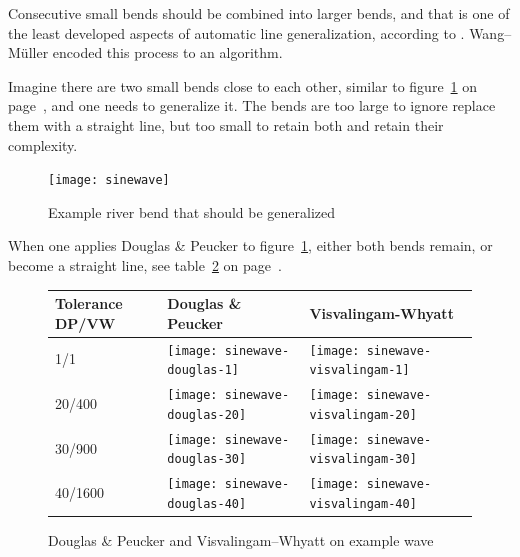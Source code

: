\documentclass[a4paper]{article}
\newcommand{\DP}{Douglas \& Peucker}
\newcommand{\VW}{Visvalingam--Whyatt}
\newcommand{\WM}{Wang--M{\"u}ller}
\begin{document}
Consecutive small bends should be combined into larger bends, and that is one
of the least developed aspects of automatic line generalization, according to
\cite{miuller1995generalization}. {\WM} encoded this process to an algorithm.

Imagine there are two small bends close to each other, similar to
figure~\ref{pic:sinewave} on page~\pageref{pic:sinewave}, and one needs
to generalize it. The bends are too large to ignore replace them with a
straight line, but too small to retain both and retain their complexity.

\begin{figure}[h]
    \centering
    \texttt{[image: sinewave]}
    \caption{Example river bend that should be generalized}
    \label{pic:sinewave}
\end{figure}

When one applies {\DP} to figure~\ref{pic:sinewave}, either both bends remain,
or become a straight line, see table~\ref{tab:comparison-sinewave} on
page~\pageref{tab:comparison-sinewave}.

\begin{figure}[h]
    \renewcommand{\tabularxcolumn}[1]{>{\center\small}m{#1}}
    \begin{tabularx}{\textwidth}{ p{1.5cm} | X | X | }
        Tolerance DP/VW                                             &
        Douglas \& Peucker                                          &
        Visvalingam-Whyatt                                          \tabularnewline \hline

        1/1                                                         &
        \texttt{[image: sinewave-douglas-1]}      &
        \texttt{[image: sinewave-visvalingam-1]}  \tabularnewline \hline

        20/400                                                      &
        \texttt{[image: sinewave-douglas-20]}     &
        \texttt{[image: sinewave-visvalingam-20]} \tabularnewline \hline

        30/900                                                      &
        \texttt{[image: sinewave-douglas-30]}     &
        \texttt{[image: sinewave-visvalingam-30]} \tabularnewline \hline

        40/1600                                                     &
        \texttt{[image: sinewave-douglas-40]}     &
        \texttt{[image: sinewave-visvalingam-40]} \tabularnewline \hline

    \end{tabularx}
    \caption{{\DP} and {\VW} on example wave}
    \label{tab:comparison-sinewave}
\end{figure}
\end{document}
